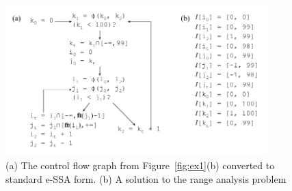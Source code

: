 \documentclass{llncs}
\begin{document}
\begin{figure}[t!]
\begin{center}
\includegraphics[width=0.9\textwidth]{images/ex_standard_eSSA}
\end{center}
\caption{\label{fig:ex_standard_eSSA}
(a) The control flow graph from Figure~\ref{fig:ex1}(b) converted to standard
e-SSA form.
(b) A solution to the range analysis problem
}
\end{figure}


\end{document}
